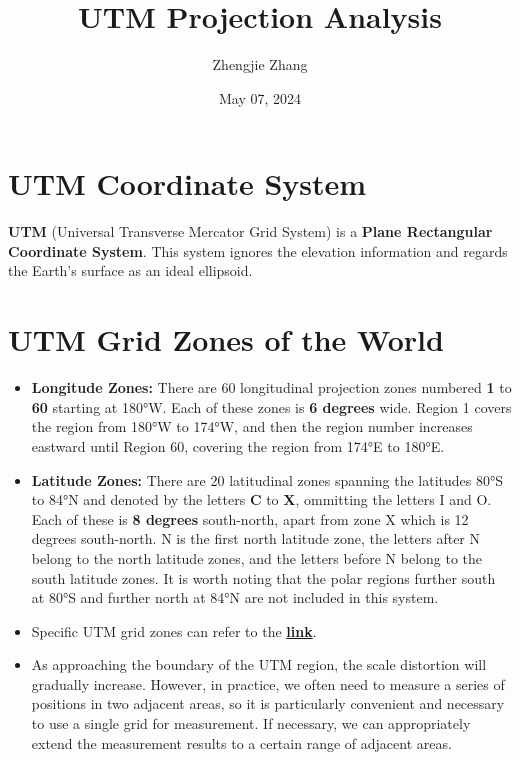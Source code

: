 \documentclass[10pt]{article}
\title{\textbf{UTM Projection Analysis}}
\author{Zhengjie Zhang}
\date{May 07, 2024}
\begin{document}
\maketitle


\section{\textbf{UTM Coordinate System}}
 \textbf{UTM} (Universal Transverse Mercator Grid System) is a \textbf{Plane Rectangular Coordinate System}. This system ignores the elevation information and regards the Earth's surface as an ideal ellipsoid.


\section{\textbf{UTM Grid Zones of the World}}

\begin{itemize}
	\item \textbf{Longitude Zones:} There are 60 longitudinal projection zones numbered \textbf{1} to \textbf{60} starting at 180°W. Each of these zones is \textbf{6 degrees} wide. Region 1 covers the region from 180°W to 174°W, and then the region number increases eastward until Region 60, covering the region from 174°E to 180°E. 
	
	\item \textbf{Latitude Zones:} There are 20 latitudinal zones spanning the latitudes 80°S to 84°N and denoted by the letters \textbf{C} to \textbf{X}, ommitting the letters I and O. Each of these is \textbf{8 degrees} south-north, apart from zone X which is 12 degrees south-north. N is the first north latitude zone, the letters after N belong to the north latitude zones, and the letters before N belong to the south latitude zones. It is worth noting that the polar regions further south at 80°S and further north at 84°N are not included in this system.
	
	\item Specific UTM grid zones can refer to the \textbf{\href{https://www.dmap.co.uk/utmworld.htm}{link}}.
	
	\item As approaching the boundary of the UTM region, the scale distortion will gradually increase. However, in practice, we often need to measure a series of positions in two adjacent areas, so it is particularly convenient and necessary to use a single grid for measurement. If necessary, we can appropriately extend the measurement results to a certain range of adjacent areas.

\end{itemize}
\end{document}
